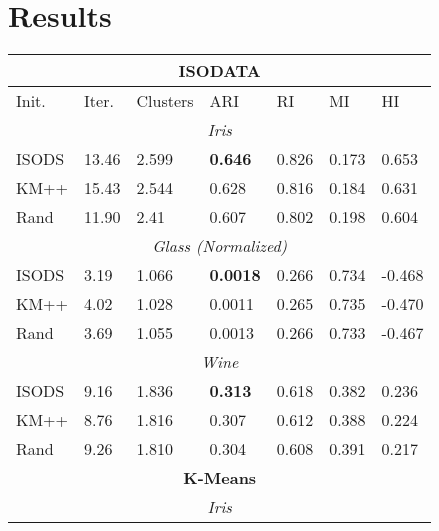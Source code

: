 \documentclass[a4paper,10pt]{article}
\begin{document}

\section{Results}

\begin{table}
      \begin{tabular}{ |p{1.25cm}||p{1.25cm} p{1.25cm} p{1.25cm} p{1.25cm} p{1.25cm} p{1.25cm}|}
            \hline
            \multicolumn{7}{|c|}{\textbf{ISODATA}}                               \\
            \hline
            Init. & Iter.  & Clusters & ARI             & RI    & MI    & HI     \\
            \hline
            \multicolumn{7}{|c|}{\textit{Iris}}                                  \\[1ex]
            ISODS & 13.46  & 2.599    & \textbf{0.646}  & 0.826 & 0.173 & 0.653  \\
            KM++  & 15.43  & 2.544    & 0.628           & 0.816 & 0.184 & 0.631  \\
            Rand  & 11.90  & 2.41     & 0.607           & 0.802 & 0.198 & 0.604  \\
            \hline
            \multicolumn{7}{|c|}{\textit{Glass (Normalized)}}                    \\[1ex]
            ISODS & 3.19   & 1.066    & \textbf{0.0018} & 0.266 & 0.734 & -0.468 \\
            KM++  & 4.02   & 1.028    & 0.0011          & 0.265 & 0.735 & -0.470 \\
            Rand  & 3.69   & 1.055    & 0.0013          & 0.266 & 0.733 & -0.467 \\
            \hline
            \multicolumn{7}{|c|}{\textit{Wine}}                                  \\[1ex]
            ISODS & 9.16   & 1.836    & \textbf{0.313}  & 0.618 & 0.382 & 0.236  \\
            KM++  & 8.76   & 1.816    & 0.307           & 0.612 & 0.388 & 0.224  \\
            Rand  & 9.26   & 1.810    & 0.304           & 0.608 & 0.391 & 0.217  \\
            \hline 
            \multicolumn{7}{|c|}{\textbf{K-Means}}                               \\
            \hline
            \multicolumn{7}{|c|}{\textit{Iris}}                                  \\[1ex]

\end{tabular}
\end{table}
\end{document}
